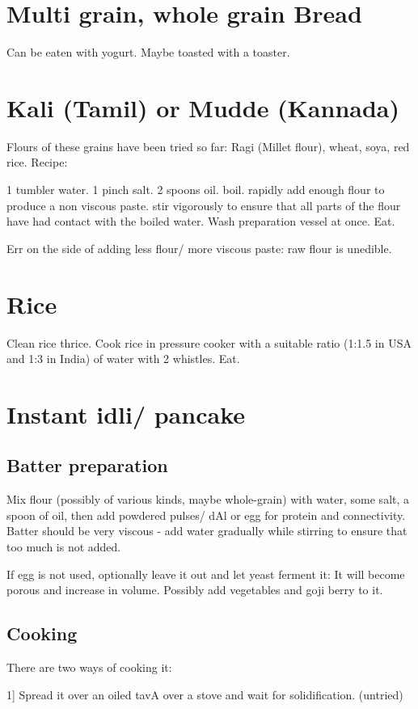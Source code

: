 \documentclass[oneside, article]{memoir}
\begin{document}
\section{Multi grain, whole grain Bread}
Can be eaten with yogurt. Maybe toasted with a toaster.

\section{Kali (Tamil) or Mudde (Kannada)}
Flours of these grains have been tried so far: Ragi (Millet flour), wheat, soya, red rice.
Recipe:

1 tumbler water. 1 pinch salt. 2 spoons oil. boil. rapidly add enough flour to produce a non viscous paste. stir vigorously to ensure that all parts of the flour have had contact with the boiled water. Wash preparation vessel at once. Eat.

Err on the side of adding less flour/ more viscous paste: raw flour is unedible.

\section{Rice}
Clean rice thrice. Cook rice in pressure cooker with a suitable ratio (1:1.5 in USA and 1:3 in India) of water with 2 whistles. Eat.

\section{Instant idli/ pancake}
\subsection{Batter preparation}
Mix flour (possibly of various kinds, maybe whole-grain) with water, some salt, a spoon of oil, then add powdered pulses/ dAl or egg for protein and connectivity. Batter should be very viscous - add water gradually while stirring to ensure that too much is not added.

If egg is not used, optionally leave it out and let yeast ferment it: It will become porous and increase in volume. Possibly add vegetables and goji berry to it.

\subsection{Cooking}
There are two ways of cooking it:

1] Spread it over an oiled tavA over a stove and wait for solidification. (untried)
\end{document}
